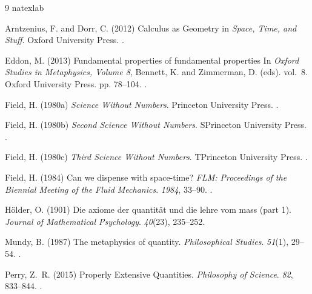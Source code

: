 \documentclass[lineno]{JFM-FLM_Au}
\begin{document}
\begin{thebibliography}{9}
\expandafter\ifx\csname natexlab\endcsname\relax\def\natexlab#1{#1}\fi

{Arntzenius, F. and Dorr, C.} (2012)  Calculus as Geometry in {\em Space, Time,
  and Stuff}. Oxford University Press.
\newblock {}.

{Eddon, M.} (2013) Fundamental properties of fundamental properties In {\em
  Oxford Studies in Metaphysics, Volume 8},  Bennett, K. and Zimmerman, D.
  (eds). vol.~8. Oxford University Press. pp. 78--104.
\newblock {}.

\bibitem[{{Field}(1980{\natexlab{a}})}]{Field1980}
{Field, H.} (1980{\natexlab{a}}) {\em Science Without Numbers}. Princeton
  University Press.
\newblock {}.

\bibitem[{{Field}(1980{\natexlab{b}})}]{Field1980y}
{Field, H.} (1980{\natexlab{b}}) {\em Second Science Without Numbers}.
  SPrinceton University Press.
\newblock {}.

\bibitem[{{Field}(1980{\natexlab{c}})}]{Field1980z}
{Field, H.} (1980{\natexlab{c}}) {\em Third Science Without Numbers}.
  TPrinceton University Press.
\newblock {}.

{Field, H.} (1984) Can we dispense with space-time? \textit{{FLM:} Proceedings
  of the Biennial Meeting of the Fluid Mechanics}. {\it
  1984}, 33--90.
\newblock {}.

{H\"{o}lder, O.} (1901) Die axiome der quantit\"{a}t und die lehre vom mass
  (part 1). \textit{Journal of Mathematical Psychology}. {\it 40}(23),
  235--252.

{Mundy, B.} (1987) The metaphysics of quantity. \textit{Philosophical Studies}.
  {\it 51}(1), 29--54.
\newblock {}.

{Perry, Z.~R.} (2015) {P}roperly {E}xtensive {Q}uantities. \textit{{P}hilosophy
  of {S}cience}. {\it 82}, 833--844.
\newblock {}.

\end{thebibliography}
\end{document}
